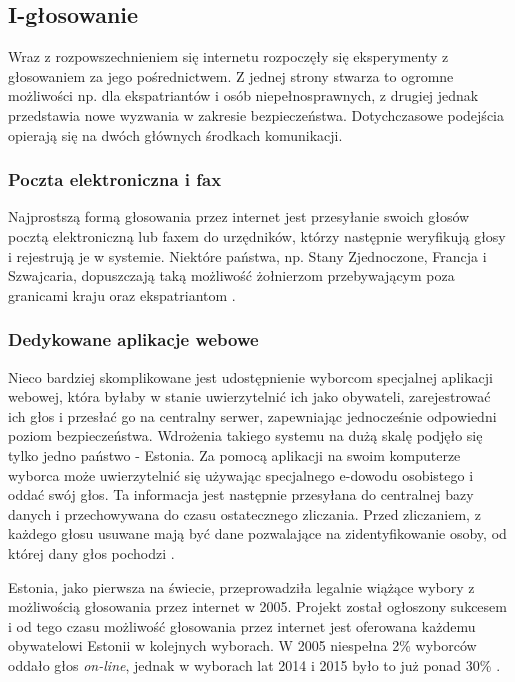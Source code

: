 \documentclass[polish]{kbk}
\begin{document}
\subsection{I-głosowanie}
Wraz z rozpowszechnieniem się internetu rozpoczęły się eksperymenty z głosowaniem za jego pośrednictwem. Z jednej strony stwarza to ogromne możliwości np. dla ekspatriantów i osób niepełnosprawnych, z drugiej jednak przedstawia nowe wyzwania w zakresie bezpieczeństwa. Dotychczasowe podejścia opierają się na dwóch głównych środkach komunikacji.

\subsubsection{Poczta elektroniczna i fax}
Najprostszą formą głosowania przez internet jest przesyłanie swoich głosów pocztą elektroniczną lub faxem do urzędników, którzy następnie weryfikują głosy i rejestrują je w systemie. Niektóre państwa, np. Stany Zjednoczone, Francja i Szwajcaria, dopuszczają taką możliwość żołnierzom przebywającym poza granicami kraju oraz ekspatriantom \cite{email-fax}.

\subsubsection{Dedykowane aplikacje webowe}
Nieco bardziej skomplikowane jest udostępnienie wyborcom specjalnej aplikacji webowej, która byłaby w stanie uwierzytelnić ich jako obywateli, zarejestrować ich głos i przesłać go na centralny serwer, zapewniając jednocześnie odpowiedni poziom bezpieczeństwa. Wdrożenia takiego systemu na dużą skalę podjęło się tylko jedno państwo - Estonia. Za pomocą aplikacji na swoim komputerze wyborca może uwierzytelnić się używając specjalnego e-dowodu osobistego i oddać swój głos. Ta informacja jest następnie przesyłana do centralnej bazy danych i przechowywana do czasu ostatecznego zliczania. Przed zliczaniem, z każdego głosu usuwane mają być dane pozwalające na zidentyfikowanie osoby, od której dany głos pochodzi \cite{estonia}.

Estonia, jako pierwsza na świecie, przeprowadziła legalnie wiążące wybory z możliwością głosowania przez internet w 2005. Projekt został ogłoszony sukcesem i od tego czasu możliwość głosowania przez internet jest oferowana każdemu obywatelowi Estonii w kolejnych wyborach. W 2005 niespełna 2\% wyborców oddało głos \textit{on-line}, jednak w wyborach lat 2014 i 2015 było to już ponad 30\% \cite{estonia-wiki}.
\end{document}
